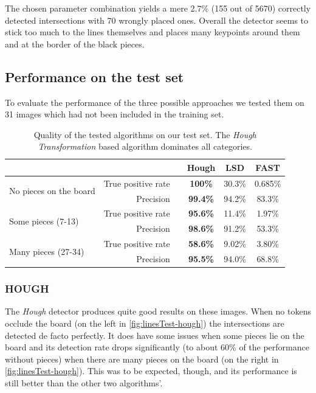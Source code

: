 	The chosen parameter combination yields a mere 2.7\% (155 out of 5670) correctly detected intersections with 70 wrongly placed ones. Overall the detector seems to stick too much to the lines themselves and places many keypoints around them and at the border of the black pieces.

	\subsection{Performance on the test set}
	\label{evaluation-visible-performance}
	To evaluate the performance of the three possible approaches we tested them on 31 images which had not been included in the training set.

	\begin{table}[b!]
		\centering
		\begin{tabular}{lrc>{\bfseries}ccc}
		    \multicolumn{2}{c}{}									&\hphantom{Abst} & Hough 	& LSD 		& FAST     \\

			\toprule
			\multirow{2}{*}{No pieces on the board}   		& True positive rate 	&& 100\%	& 30.3\%  	& 0.685\%  \\
															& Precision			 	&& 99.4\% 	& 94.2\%  	& 83.3\%  \\
			\midrule
			\multirow{2}{*}{Some pieces (7-13)}				& True positive rate 	&& 95.6\% 	& 11.4\% 	& 1.97\%   \\
															& Precision 			&& 98.6\% 	& 91.2\%  	& 53.3\%  \\
			\midrule
			\multirow{2}{*}{Many pieces (27-34)} 			& True positive rate 	&& 58.6\% 	& 9.02\% 	& 3.80\%   \\
															& Precision			 	&& 95.5\% 	& 94.0\%  	& 68.8\%  \\
			\bottomrule
		\end{tabular}
		\caption{Quality of the tested algorithms on our test set. The \emph{Hough Transformation} based algorithm dominates all categories.}
		\label{tab:linesTest}
	\end{table}

	\subsubsection{HOUGH}
	\label{evaluation-visible-performance-hough}
	The \emph{Hough} detector produces quite good results on these images. When no tokens occlude the board (on the left in \autoref{fig:linesTest-hough}) the intersections are detected de facto perfectly. It does have some issues when some pieces lie on the board and its detection rate drops significantly (to about 60\% of the performance without pieces) when there are many pieces on the board (on the right in \autoref{fig:linesTest-hough}). This was to be expected, though, and its performance is still better than the other two algorithms'.

